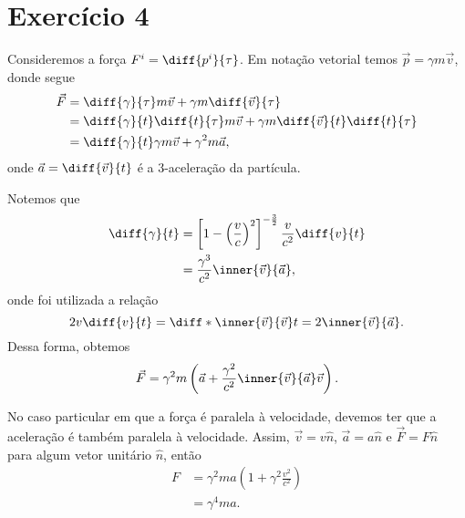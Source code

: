 \section*{Exercício 4}

Consideremos a força \(F^i = \diff{p^i}{\tau}\). Em notação vetorial temos \(\vec{p} = \gamma m \vec{v}\), donde segue
\begin{align*}
    \vec{F} &= \diff{\gamma}{\tau} m \vec{v} + \gamma m \diff{\vec{v}}{\tau}\\
            &= \diff{\gamma}{t} \diff{t}{\tau} m \vec{v} + \gamma m \diff{\vec{v}}{t} \diff{t}{\tau}\\
            &= \diff{\gamma}{t} \gamma m \vec{v} + \gamma^2m\vec{a},
\end{align*}
onde \(\vec{a} = \diff{\vec{v}}{t}\) é a 3-aceleração da partícula.

Notemos que
\begin{align*}
    \diff{\gamma}{t} &= \left[1 - \left(\frac{v}{c}\right)^2\right]^{-\frac32} \frac{v}{c^2}\diff{v}{t}\\
                     &= \frac{\gamma^3}{c^2} \inner{\vec{v}}{\vec{a}},
\end{align*}
onde foi utilizada a relação
\begin{equation*}
    2v\diff{v}{t} = \diff*{\inner{\vec{v}}{\vec{v}}}{t} = 2\inner{\vec{v}}{\vec{a}}.
\end{equation*}
Dessa forma, obtemos
\begin{equation*}
    \vec{F} = \gamma^2 m \left(\vec{a} + \frac{\gamma^2}{c^2}\inner{\vec{v}}{\vec{a}}\vec{v}\right).
\end{equation*}

No caso particular em que a força é paralela à velocidade, devemos ter que a aceleração é também paralela à velocidade. Assim, \(\vec{v} = v \hat{n}\), \(\vec{a} = a\hat{n}\) e \(\vec{F} = F\hat{n}\) para algum vetor unitário \(\hat{n}\), então
\begin{align*}
    F &= \gamma^2 ma \left(1 + \gamma^2\frac{v^2}{c^2}\right)\\
      &= \gamma^4 ma.
\end{align*}
